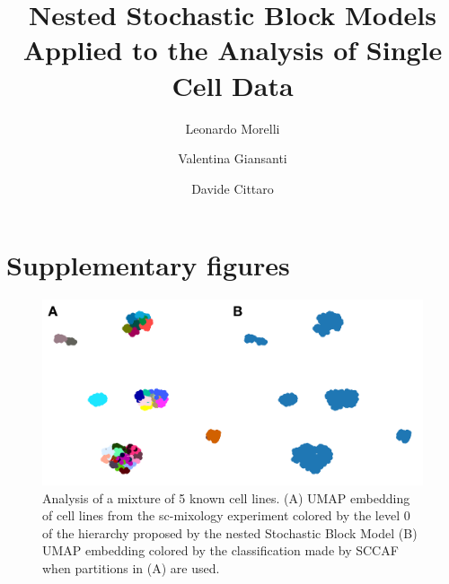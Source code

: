 \documentclass[11pt, titlepage, twoside]{article}
\begin{document}
\title{Nested Stochastic Block Models Applied to the Analysis of Single Cell Data}
\author[1,2]{Leonardo Morelli}
\author[1,3]{Valentina Giansanti}
\author[1]{Davide Cittaro}
\maketitle
\section*{Supplementary figures}


\begin{figure}[htbp]
\centering
\includegraphics[keepaspectratio,width=\textwidth,height=0.75\textheight]{Tian_NSBM0.png}
\caption[]{Analysis of a mixture of 5 known cell lines. (A) UMAP  embedding of cell lines from the sc-mixology experiment colored by the level 0 of the hierarchy proposed by the nested Stochastic Block Model (B) UMAP embedding colored by the classification made by SCCAF when partitions in (A) are used.}\label{Tian_NSBM0}
\end{figure}
\clearpage
\end{document}
